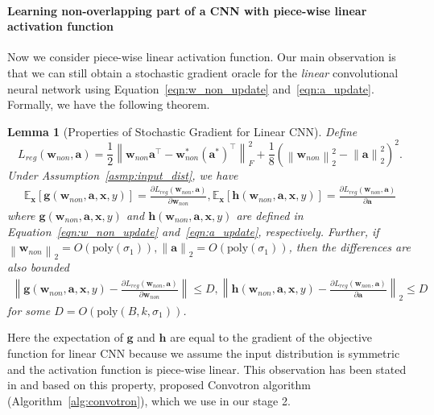 \documentclass[11pt]{article}
\newcommand{\poly}{\mathrm{poly}}
\newcommand{\vect}[1]{\mathbf{#1}}
\newcommand{\norm}[1]{\left\|#1\right\|}
\newcommand{\expect}{\mathbb{E}}
\newtheorem{lem}{Lemma}[section]
\newcommand{\simon}[1]{\textcolor{blue}{[Simon: #1]}}
\begin{document}
\paragraph{Learning non-overlapping part of a CNN with piece-wise linear activation function}
Now we consider piece-wise linear activation function.
Our main observation is that we can still obtain a stochastic gradient oracle for the \emph{linear} convolutional neural network using Equation~\eqref{eqn:w_non_update} and~\eqref{eqn:a_update}.
Formally, we have the following theorem.
\begin{lem}[Properties of Stochastic Gradient for Linear CNN]\label{thm:unbiased_for_linear}
Define \[
L_{reg}\left(\vect{w}_{non},\vect{a}\right) = \frac{1}{2}\norm{\vect{w}_{non}\vect{a}^\top - \vect{w}^*_{non}\left(\vect{a}^*\right)^\top}_F^2 + \frac{1}{8}\left(\norm{\vect{w}_{non}}_2^2 - \norm{\vect{a}}_2^2\right)^2.
\]
Under Assumption~\ref{asmp:input_dist}, we have \begin{align*}
\expect_{\vect{x}}\left[\vect{g}\left(\vect{w}_{non},\vect{a},\vect{x},y\right)\right] =
\frac{\partial L_{reg}\left(\vect{w}_{non},\vect{a}\right)}{\partial \vect{w}_{non}}, \expect_{\vect{x}}\left[\vect{h}\left(\vect{w}_{non},\vect{a},\vect{x},y\right)\right] =
\frac{\partial L_{reg}\left(\vect{w}_{non},\vect{a}\right)}{\partial \vect{a}}
\end{align*} where $\vect{g}\left(\vect{w}_{non},\vect{a},\vect{x},y\right)$ and $\vect{h}\left(\vect{w}_{non},\vect{a},\vect{x},y\right)$ are defined in Equation~\eqref{eqn:w_non_update} and~\eqref{eqn:a_update}, respectively.
Further, if $\norm{\vect{w}_{non}}_2 = O(\poly\left(\sigma_1\right)), \norm{\vect{a}}_2 = O(\poly\left(\sigma_1\right))$, then the differences are also bounded \begin{align*}
\norm{\vect{g}\left(\vect{w}_{non},\vect{a},\vect{x},y\right) - \frac{\partial L_{reg}\left(\vect{w}_{non},\vect{a}\right)}{\partial \vect{w}_{non}}} \le D,  \norm{\vect{h}\left(\vect{w}_{non},\vect{a},\vect{x},y\right)-\frac{\partial L_{reg}\left(\vect{w}_{non},\vect{a}\right)}{\partial \vect{a}}}_2 \le D
\end{align*} for some $D = O\left(\poly\left(B,k,\sigma_1\right)\right)$.
\end{lem}%
Here the expectation of $\vect{g}$ and $\vect{h}$ are equal to the gradient of the objective function for linear CNN because we assume the input distribution is symmetric and the activation function is piece-wise linear.
This observation has been stated in \cite{goel2018learning} and based on this property, \citet{goel2018learning} proposed Convotron algorithm (Algorithm~\ref{alg:convotron}), which we use in our stage 2.
\end{document}
